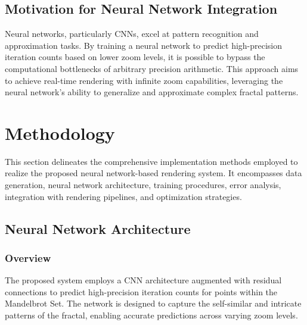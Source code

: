 \documentclass[journal]{IEEEaccess}
\begin{document}
\subsection{Motivation for Neural Network Integration}
Neural networks, particularly CNNs, excel at pattern recognition and approximation tasks. By training a neural network to predict high-precision iteration counts based on lower zoom levels, it is possible to bypass the computational bottlenecks of arbitrary precision arithmetic. This approach aims to achieve real-time rendering with infinite zoom capabilities, leveraging the neural network's ability to generalize and approximate complex fractal patterns.

\section{Methodology}
\label{sec:methodology}
This section delineates the comprehensive implementation methods employed to realize the proposed neural network-based rendering system. It encompasses data generation, neural network architecture, training procedures, error analysis, integration with rendering pipelines, and optimization strategies.

\subsection{Neural Network Architecture}
\subsubsection{Overview}
The proposed system employs a CNN architecture augmented with residual connections to predict high-precision iteration counts for points within the Mandelbrot Set. The network is designed to capture the self-similar and intricate patterns of the fractal, enabling accurate predictions across varying zoom levels.
\end{document}
